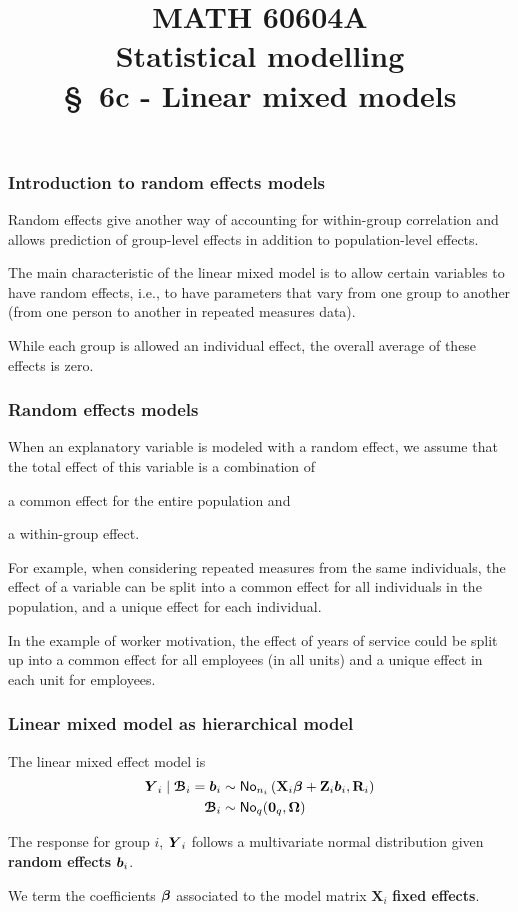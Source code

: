 \documentclass{beamer}
\title[\color{white}{MATH 60604A \S~6c - Linear mixed models}]{\texorpdfstring{MATH 60604A \\Statistical modelling \\ \S~6c - Linear mixed models}{MATH 60604A \\Statistical modelling \\ \S~6c - Linear mixed models}}
\author{}
\institute{HEC Montréal\\
Department of Decision Sciences}
\date{}
\begin{document}
\frame{\titlepage}



\begin{frame}
\frametitle{Introduction to random effects models}
 Random effects give another way of accounting for within-group correlation and allows prediction of group-level effects in addition to population-level effects.
 \bi \item The main characteristic of the \alert{linear mixed model} is to allow certain variables to have \alert{random effects}, i.e., \alert{to have parameters that vary from one group to another} (from one person to another in repeated measures data). 
\item While each group is allowed an individual effect, the overall average of these effects is zero.
\ei
\end{frame}

\begin{frame}[fragile]
\frametitle{Random effects models}
\bi
\item When an explanatory variable is modeled with a random effect, we assume that \alert{the total effect of this variable is a combination of}
\be

\item a \alert{common effect} for the entire population and  
\item a \alert{within-group effect}. 
\ee
\item For example, when considering repeated measures from the same individuals, the effect of a variable can be split into a common effect for all individuals in the population, and a unique effect for each individual. 
\item In the example of worker motivation, the effect of years of service could be split up into a common effect for all employees (in all units) and a unique effect in each unit for employees.
\ei
\end{frame}
\begin{frame}
 \frametitle{Linear mixed model as hierarchical model}
The linear mixed effect model is 
 \begin{align*}
  \boldsymbol {Y}_i \mid \boldsymbol {\mathcal{B}}_i =\boldsymbol {b}_i &\sim \mathsf{No}_{n_i}\left( \mathbf{X}_i \boldsymbol {\beta} + \mathbf{Z}_i\boldsymbol {b}_i, \mathbf{R}_i\right) \\
  \boldsymbol {\mathcal{B}}_i & \sim \mathsf{No}_{q}( \boldsymbol {0}_q, \boldsymbol {\Omega})
 \end{align*}

 \bi \item 
 The response for group $i$, $\boldsymbol {Y}_i$ follows a multivariate normal distribution given \textbf{random effects} $\boldsymbol {b}_i$.
 \item 
 We term the coefficients $\boldsymbol {\beta}$ associated to the model matrix $\mathbf{X}_i$ \textbf{fixed effects}.
 \ei 
\end{frame}
\end{document}
